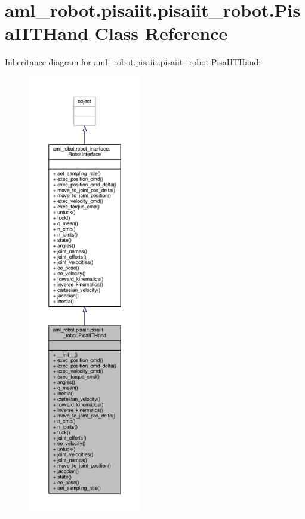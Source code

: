 \hypertarget{classaml__robot_1_1pisaiit_1_1pisaiit__robot_1_1_pisa_i_i_t_hand}{\section{aml\-\_\-robot.\-pisaiit.\-pisaiit\-\_\-robot.\-Pisa\-I\-I\-T\-Hand Class Reference}
\label{classaml__robot_1_1pisaiit_1_1pisaiit__robot_1_1_pisa_i_i_t_hand}
}


Inheritance diagram for aml\-\_\-robot.\-pisaiit.\-pisaiit\-\_\-robot.\-Pisa\-I\-I\-T\-Hand\-:
\nopagebreak
\begin{figure}[H]
\begin{center}
\leavevmode
\includegraphics[height=550pt]{classaml__robot_1_1pisaiit_1_1pisaiit__robot_1_1_pisa_i_i_t_hand__inherit__graph}
\end{center}
\end{figure}


